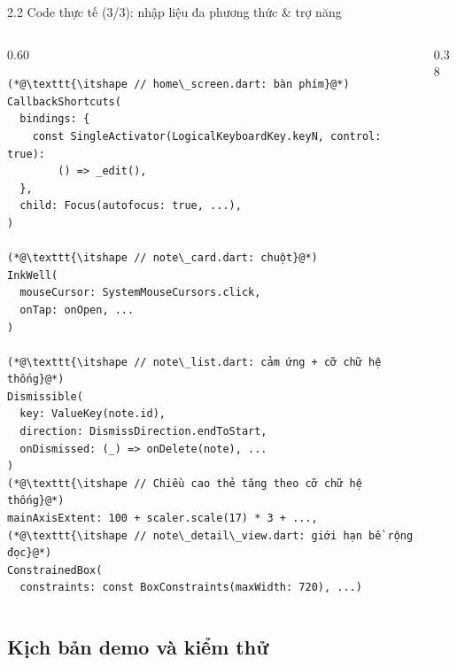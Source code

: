 \documentclass[aspectratio=169,10pt]{beamer}
\newcommand{\api}[1]{\texttt{\bfseries #1}}   %
\begin{document}
\begin{frame}[fragile]{2.2 Code thực tế (3/3): nhập liệu đa phương thức \& trợ năng}
  \begin{columns}[T]
    \begin{column}{0.60\textwidth}
\begin{lstlisting}[basicstyle=\ttfamily\fontsize{6.0}{7.0}\selectfont]
(*@\texttt{\itshape // home\_screen.dart: bàn phím}@*)
CallbackShortcuts(
  bindings: {
    const SingleActivator(LogicalKeyboardKey.keyN, control: true):
        () => _edit(),
  },
  child: Focus(autofocus: true, ...),
)

(*@\texttt{\itshape // note\_card.dart: chuột}@*)
InkWell(
  mouseCursor: SystemMouseCursors.click,
  onTap: onOpen, ...
)

(*@\texttt{\itshape // note\_list.dart: cảm ứng + cỡ chữ hệ thống}@*)
Dismissible(
  key: ValueKey(note.id),
  direction: DismissDirection.endToStart,
  onDismissed: (_) => onDelete(note), ...
)
(*@\texttt{\itshape // Chiều cao thẻ tăng theo cỡ chữ hệ thống}@*)
mainAxisExtent: 100 + scaler.scale(17) * 3 + ...,
(*@\texttt{\itshape // note\_detail\_view.dart: giới hạn bề rộng đọc}@*)
ConstrainedBox(
  constraints: const BoxConstraints(maxWidth: 720), ...)
\end{lstlisting}
    \end{column}
    \begin{column}{0.38\textwidth}
      \footnotesize
    \end{column}
  \end{columns}
\end{frame}

\subsection{Kịch bản demo và kiểm thử}
\end{document}

